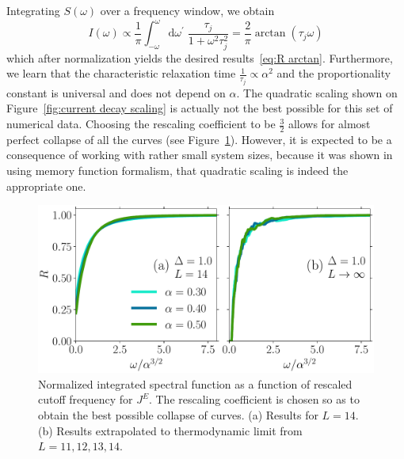 Integrating \(S(\omega)\) over a frequency window, we obtain
\begin{equation*}
  I(\omega) \propto \frac{1}{\pi}\int_{-\omega}^{\omega}\mathrm{d}\omega^{\prime}\; 
  \frac{\tau_{j}}{1+\omega^2\tau_{j}^2} = \frac{2}{\pi} \arctan(\tau_{j} \omega)
\end{equation*}
which after normalization yields the desired results~\eqref{eq:R arctan}. Furthermore, we learn that the 
characteristic relaxation time \(\frac{1}{\tau_{j}} \propto \alpha^2\) and the proportionality
constant is universal and does not depend on \(\alpha\).
The quadratic scaling shown on Figure~\ref{fig:current decay scaling} is actually not the
best possible for this set of numerical data. Choosing the rescaling coefficient to be
\(\frac{3}{2}\) allows for almost perfect collapse of all the curves 
(see Figure~\ref{fig:current decay perfect scaling}). However, it is expected to be a consequence
of working with rather small system sizes, because it was shown 
in~\textcite{Mierzejewski2015Approx} using memory function formalism, that quadratic scaling
is indeed the appropriate one.
\begin{figure}[ht]
  \centering
  \includegraphics[width=\figsize\textwidth]{Figures/current_perfect_scaling_small.pdf}
  \caption{Normalized integrated spectral function as a function of 
  rescaled cutoff frequency for \(J^E\). The rescaling coefficient is chosen so as to obtain the 
  best possible collapse of curves. (a) Results for \(L=14\). (b) Results extrapolated
   to thermodynamic limit from \(L=11,12,13,14\).}\label{fig:current decay perfect scaling}
\end{figure}
